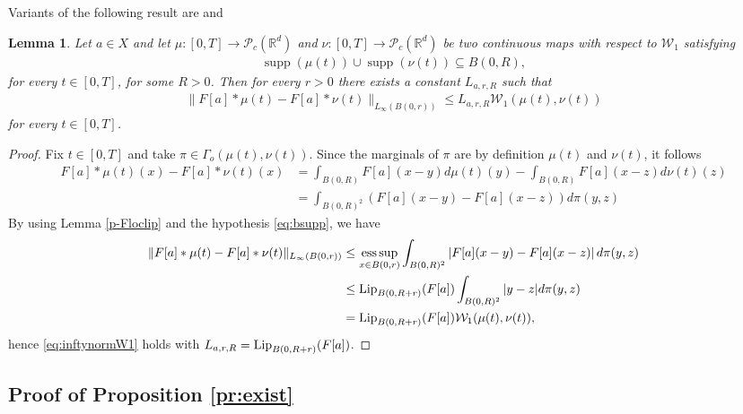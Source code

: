 \documentclass[A4paper,11pt]{article}
\newtheorem{lemma}[theorem]{Lemma}
\theoremstyle{definition}
\newcommand{\Lip}{\textup{Lip}}
\newcommand{\R}{\mathbb{R}}
\newcommand{\W}{\mathcal{W}}
\DeclareMathOperator{\supp}{supp}
\DeclareMathOperator*{\esssup}{ess\,sup}
\begin{document}
Variants of the following result are \cite[Lemma 6.7]{MFOC} and \cite[Lemma 4.7]{CanCarRos10}

\begin{lemma}\label{p-lipkernel}
Let $a \in X$ and let $\mu:[0,T] \rightarrow \mathcal{P}_c(\R^d)$ and $\nu: [0,T] \to \mathcal{P}_c(\R^d)$ be two continuous maps with respect to $\W_1$ satisfying
\begin{align}\label{eq:bsupp}
\supp(\mu(t)) \cup \supp(\nu(t)) \subseteq B(0,R),
\end{align}
for every $t \in [0,T]$, for some $R > 0$. Then for every $r > 0$ there exists a constant $L_{a,r,R}$ such that
\begin{align}\label{eq:inftynormW1}
\|F[a] * \mu(t) - F[a] * \nu(t)\|_{L_{\infty}(B(0,r))} \leq L_{a,r,R} \W_1(\mu(t),\nu(t))
\end{align}
for every $t \in [0,T]$.
\end{lemma}
\begin{proof}
Fix $t \in [0,T]$ and take $\pi \in \Gamma_o(\mu(t),\nu(t))$. Since the marginals of $\pi$ are by definition $\mu(t)$ and $\nu(t)$, it follows
\begin{align*}
F[a] * \mu(t)(x) - F[a] * \nu(t)(x) &= \int_{B(0,R)} F[a](x-y) d\mu(t)(y) - \int_{B(0,R)} F[a](x-z) d\nu(t)(z)  \\
&= \int_{B(0,R)^2} \left(F[a](x-y) - F[a](x-z)\right) d\pi(y,z)
\end{align*}
By using Lemma \ref{p-Floclip} and the hypothesis \eqref{eq:bsupp}, we have
\begin{align*}
\|F[a] * \mu(t) - F[a] * \nu(t)\|_{L_{\infty}(B(0,r))} &\leq \esssup_{x \in B(0,r)} \int_{B(0,R)^2} \left|F[a](x-y) - F[a](x-z)\right| d\pi(y,z) \\
&\leq \Lip_{B(0,R+r)}(F[a]) \int_{B(0,R)^2} |y - z| d\pi(y,z) \\
&= \Lip_{B(0,R+r)}(F[a]) \W_1(\mu(t),\nu(t)),
\end{align*}
hence \eqref{eq:inftynormW1} holds with $L_{a,r,R} = \Lip_{B(0,R+r)}(F[a])$.
\end{proof}


\subsection{Proof of Proposition \ref{pr:exist}}\label{ap2}
\end{document}
